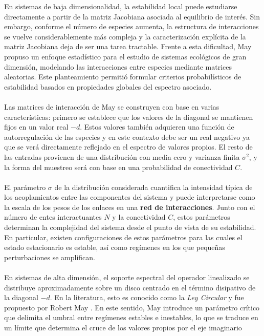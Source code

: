 En sistemas de baja dimensionalidad, la estabilidad local puede estudiarse directamente a partir de la matriz Jacobiana asociada al equilibrio de interés. Sin embargo, conforme el número de especies aumenta, la estructura de interacciones se vuelve considerablemente más compleja y la caracterización explícita de la matriz Jacobiana deja de ser una tarea tractable. Frente a esta dificultad, May propuso un enfoque estadístico para el estudio de sistemas ecológicos de gran dimensión, modelando las interacciones entre especies mediante matrices aleatorias. Este planteamiento permitió formular criterios probabilísticos de estabilidad basados en propiedades globales del espectro asociado.\\
\\
Las matrices de interacción de May se construyen con base en varias características: primero se establece que los valores de la diagonal se mantienen fijos en un valor real $-d$. Estos valores también adquieren una función de autorregulación de las especies y en este contexto debe ser un real negativo ya que se verá directamente reflejado en el espectro de valores propios. El resto de las entradas provienen de una distribución con media cero y varianza finita $\sigma^2$, y la forma del muestreo será con base en una probabilidad de conectividad $C$.\\
\\
El parámetro $\sigma$ de la distribución considerada cuantifica la intensidad típica de los acoplamientos entre las componentes del sistema y puede interpretarse como la escala de los pesos de los enlaces en una \textbf{red de interacciones}. Junto con el número de entes interactuantes $N$ y la conectividad $C$, estos parámetros determinan la complejidad del sistema desde el punto de vista de su estabilidad. En particular, existen configuraciones de estos parámetros para las cuales el estado estacionario es estable, así como regímenes en los que pequeñas perturbaciones se amplifican. 
\\
\\
En sistemas de alta dimensión, el soporte espectral del operador linealizado se distribuye aproximadamente sobre un disco centrado en el término disipativo de la diagonal $-d$. En la literatura, esto es conocido como la \textit{Ley Circular} y fue propuesto por Robert May \cite{may1972will}. En este sentido, May introduce un parámetro crítico que delimita el umbral entre regímenes estables e inestables, lo que se traduce en un límite que determina el cruce de los valores propios por el eje imaginario
